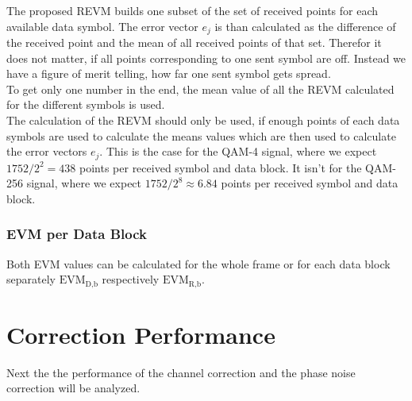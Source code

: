 The proposed \acrfull{REVM} builds one subset of the set of received points for
each available data symbol. The error vector $e_j$ is than calculated as the
difference of the received point and the mean of all received points of that
set. Therefor it does not matter, if all points corresponding to one sent symbol
are off. Instead we have a figure of merit telling, how far one sent symbol gets
spread. \\

To get only one number in the end, the mean value of all the \gls{REVM}
calculated for the different symbols is used. \\

The calculation of the \gls{REVM} should only be used, if enough points
of each data symbols are used to calculate the means values which are then
used to calculate the error vectors $e_j$. This is the case for the \gls{QAM}-4
signal, where we expect $1752 / 2^2 = 438$ points per received symbol and
data block.
It isn't for the \gls{QAM}-256 signal, where we expect $1752 / 2^8 \approx 6.84$
points per received symbol and data block.

\subsubsection{\gls{EVM} per Data Block}
Both \gls{EVM} values can be calculated for the whole frame or for each
data block separately $\text{EVM}_\text{D,b}$ respectively
$\text{EVM}_\text{R,b}$.

\section{Correction Performance}
Next the the performance of the channel correction and the
phase noise correction will be analyzed. \\


